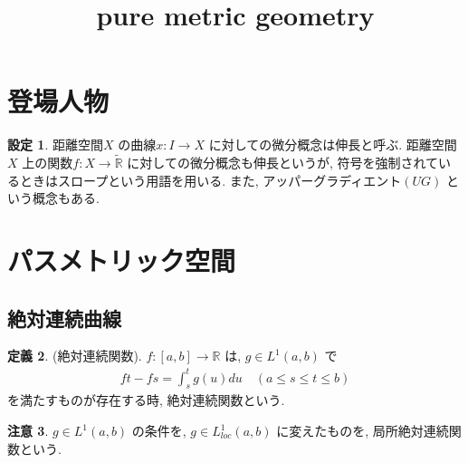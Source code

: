 \documentclass[10pt, fleqn, label-section=none]{bxjsarticle}
\title{pure metric geometry}
\date{}
\author{}
\theoremstyle{definition}
\newtheorem{dfn}{定義}[section]
\newtheorem{setting}[dfn]{設定}
\newtheorem{remark}[dfn]{注意}
\renewcommand{\;}{\, ; \,}
\begin{document}
\maketitle


\section{登場人物}

\begin{setting}
距離空間$X$ の曲線$x: I \rightarrow X$ に対しての微分概念は伸長と呼ぶ. 距離空間$X$ 上の関数$f: X \rightarrow \tilde {\mathbb R}$ に対しての微分概念も伸長というが, 符号を強制されているときはスロープという用語を用いる. また, アッパーグラディエント$(UG)$ という概念もある.  
\end{setting}



\section{パスメトリック空間}



\subsection{絶対連続曲線}

\begin{dfn}(絶対連続関数). $f: [a,b] \rightarrow \mathbb R$ は, $ g \in L^1 (a,b)$ で
\begin{align*} ft - fs = \int_s^t g(u) du \quad (a \leq s \leq t \leq b) \end{align*}
を満たすものが存在する時, 絶対連続関数という.
\end{dfn}

\begin{remark}
$g \in L^1(a,b)$ の条件を, $g \in L^1_{loc} (a, b)$ に変えたものを, 局所絶対連続関数という. 
\end{remark}
\end{document}
